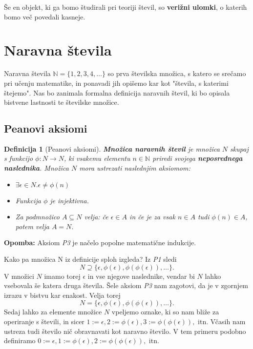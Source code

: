 \documentclass[12pt, a4paper]{article}
\newtheorem{defi}{Definicija}
\newenvironment{opom}[1][]{\par\medskip\noindent \textbf{Opomba: }}{\medskip}
\begin{document}
Še en objekt, ki ga bomo študirali pri teoriji števil, so \textbf{verižni ulomki}, o katerih bomo več povedali kasneje.

\section{Naravna števila}

Naravna števila $\mathbb{N} = \{1,2,3,4,\dots\}$ so prva številska množica, s katero se srečamo pri učenju matematike, in ponavadi jih opišemo kar kot "števila, s katerimi štejemo". Nas bo zanimala formalna definicija naravnih števil, ki bo opisala bistvene lastnosti te številske množice.

\subsection{Peanovi aksiomi}

\begin{defi}[Peanovi aksiomi]
\textbf{Množica naravnih števil} je množica $N$ skupaj s funkcijo $\phi : N\to N$, ki vsakemu elementu $n\in \mathbb{N}$ priredi svojega \textbf{neposrednega naslednika}. Množica $N$ mora ustrezati naslednjim aksiomom:
\begin{itemize}
\item[P1.] $\exists \epsilon \in N. \epsilon \neq \phi(n)$
\item[P2.] Funkcija $\phi$ je injektivna.
\item[P3.] Za podmnožico $A\subseteq N$ velja:
če $\epsilon \in A$ in če je za vsak $n\in A$ tudi $\phi(n) \in A$, potem velja $A=N$.
\end{itemize}
\end{defi}

\begin{opom}
Aksiom \textit{P3} je načelo popolne matematične indukcije.
\end{opom}

Kako pa množica N iz definicije sploh izgleda? Iz \textit{P1} sledi $$ N\supseteq \{\epsilon, \phi(\epsilon),\phi(\phi(\epsilon)),\dots\}.$$ V množici $N$ imamo torej $\epsilon$ in vse njegove naslednike, vendar bi $N$ lahko vsebovala še katera druga števila. Šele aksiom \textit{P3} nam zagotovi, da je v zgornjem izrazu v bistvu kar enakost. Velja torej  $$ N = \{\epsilon, \phi(\epsilon),\phi(\phi(\epsilon)),\dots\}.$$ Sedaj lahko za elemente množice $N$ vpeljemo oznake, ki so nam bliže za operiranje s števili, in sicer $1:=\epsilon, 2:=\phi(\epsilon), 3:=\phi(\phi(\epsilon)),$ itn. Včasih nam ustreza tudi število nič obravnavati kot naravno število. V tem primeru podobno definiramo $0:=\epsilon, 1:=\phi(\epsilon), 2:=\phi(\phi(\epsilon)),$ itn.
\end{document}

